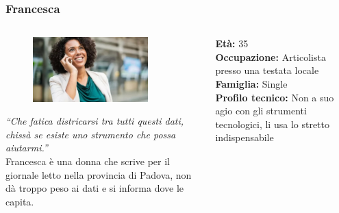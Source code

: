 \documentclass[handout]{beamer}
\begin{document}
		\begin{frame}
			\frametitle{Francesca}
			\begin{columns}[t]
				\begin{column}[T]{5cm}
					\begin{figure}
						\centering
						\vspace{-10pt}
						\includegraphics[height=2.5cm]{img/francesca}
					\end{figure}
					\vspace{-10pt}
					\textit{``Che fatica districarsi tra tutti questi dati, chissà se esiste uno strumento che possa aiutarmi.''}\\
					Francesca è una donna che scrive per il giornale letto nella provincia di Padova, non dà troppo peso ai dati e si informa dove le capita.
				\end{column}
				\begin{column}[T]{5cm}
					\textbf{Età:} 35\\
					\textbf{Occupazione:} Articolista presso una testata locale\\
					\textbf{Famiglia:} Single\\
					\textbf{Profilo tecnico:} Non a suo agio con gli strumenti tecnologici, li usa lo stretto indispensabile\\
				\end{column}
			\end{columns}
		\end{frame}
\end{document}
